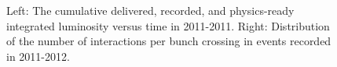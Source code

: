 \begin{figure}[htbp]
	\centering
	\hfill
	\hfill
	\hfill
	\caption{Left: The cumulative delivered, recorded, and physics-ready integrated luminosity versus time in 2011-2011. Right: Distribution of the number of interactions per bunch crossing in events recorded in 2011-2012.}
	
\end{figure}


